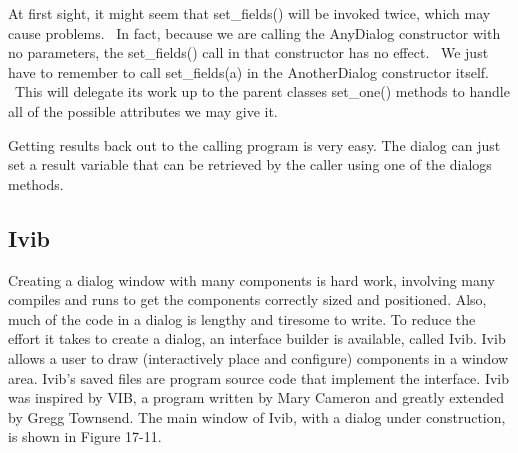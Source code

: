 At first sight, it might seem that \textsf{set\_fields()} will be
invoked twice, which may cause problems. \ In fact, because we are
calling the \textsf{AnyDialog} constructor with no parameters, the
\textsf{set\_fields()} call in that constructor has no effect. \ We
just have to remember to call \textsf{set\_fields(a)} in the
\textsf{AnotherDialog} constructor itself. \ This will delegate its
work up to the parent classes{\textquotesingle} \textsf{set\_one()}
methods to handle all of the possible attributes we may give it.

Getting results back out to the calling program is very easy. The dialog
can just set a result variable that can be retrieved by
the caller using one of the dialog{\textquotesingle}s methods.

\subsection[Ivib]{Ivib}
Creating a dialog window with many components is hard
work, involving many compiles and runs to get the components
correctly sized and positioned. Also, much of the code in a
dialog is lengthy and tiresome to write. To reduce the effort it
takes to create a dialog, an
interface builder is available, called Ivib.
Ivib allows a user to draw (interactively place and configure)
components in a window area. Ivib's saved files are program source code
that implement the interface. Ivib was inspired by VIB, a program
written by Mary Cameron and greatly extended by
Gregg Townsend. The main window of Ivib, with a
dialog under construction, is shown in Figure 17-11.



